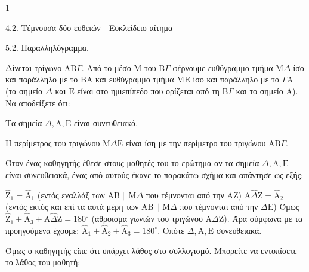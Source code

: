 \begin{ylh}{1}
    \item 4.2. Τέμνουσα δύο ευθειών - Ευκλείδειο αίτημα
    \item 5.2. Παραλληλόγραμμα.
\end{ylh}
Δίνεται τρίγωνο $\mathrm{A}\mathrm{B}\Gamma$. Από το μέσο $\mathrm{M}$ του $\mathrm{B}\Gamma$ φέρνουμε ευθύγραμμο τμήμα $\mathrm{M}\Delta$ ίσο και παράλληλο με το $\mathrm{B}\mathrm{A}$ και ευθύγραμμο τμήμα $\mathrm{M}\mathrm{E}$ ίσο και παράλληλο με το $\Gamma\mathrm{A}$ (τα σημεία $\Delta$ και $\mathrm{E}$ είναι στο ημιεπίπεδο που ορίζεται από τη $\mathrm{B}\Gamma$ και το σημείο $\mathrm{A}$). Να αποδείξετε ότι:
\begin{alist}
    \item Τα σημεία $\Delta, \mathrm{A}, \mathrm{E}$ είναι συνευθειακά. 
    \item Η περίμετρος του τριγώνου $\mathrm{M}\Delta\mathrm{E}$ είναι ίση με την περίμετρο του τριγώνου $\mathrm{A}\mathrm{B}\Gamma$. 
    \item Όταν ένας καθηγητής έθεσε στους μαθητές του το ερώτημα αν τα σημεία $\Delta, \mathrm{A}, \mathrm{E}$ είναι συνευθειακά, ένας από αυτούς έκανε το παρακάτω σχήμα και απάντησε ως εξής:
    
    $\hat{\mathrm{Z}}_1 = \hat{\mathrm{A}}_1$ (εντός εναλλάξ των $\mathrm{A}\mathrm{B} \parallel \mathrm{M}\Delta$ που τέμνονται από την $\mathrm{A}\mathrm{Z}$)
    $\mathrm{A}\hat{\Delta}\mathrm{Z} = \hat{\mathrm{A}}_2$ (εντός εκτός και επί τα αυτά μέρη των $\mathrm{A}\mathrm{B} \parallel \mathrm{M}\Delta$ που τέμνονται από την $\Delta\mathrm{E}$)
    Όμως $\hat{\mathrm{Z}}_1 + \hat{\mathrm{A}}_3 + \mathrm{A}\hat{\Delta}\mathrm{Z} = 180^\circ$ (άθροισμα γωνιών του τριγώνου $\mathrm{A}\Delta\mathrm{Z}$). Άρα σύμφωνα με τα προηγούμενα έχουμε: $\hat{\mathrm{A}}_1 + \hat{\mathrm{A}}_2 + \hat{\mathrm{A}}_3 = 180^\circ$. Οπότε $\Delta, \mathrm{A}, \mathrm{E}$ συνευθειακά.
    
    Όμως ο καθηγητής είπε ότι υπάρχει λάθος στο συλλογισμό. Μπορείτε να εντοπίσετε το λάθος του μαθητή; 
\end{alist}
